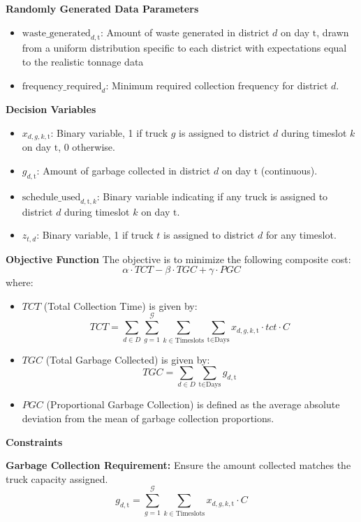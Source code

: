 \documentclass{article}
\begin{document}
\textbf{Randomly Generated Data Parameters}
\begin{itemize}
    \item \( \text{waste\_generated}_{d, \text{t}} \): Amount of waste generated in district \( d \) on day \( \text{t} \), drawn from a uniform distribution specific to each district with expectations equal to the realistic tonnage data
    \item \( \text{frequency\_required}_d \): Minimum required collection frequency for district \( d \).
\end{itemize}


\textbf{Decision Variables}
\begin{itemize}
    \item \( x_{d,g,k,\text{t}} \): Binary variable, 1 if truck \( g \) is assigned to district \( d \) during timeslot \( k \) on day \( \text{t} \), 0 otherwise.
    \item \( g_{d, \text{t}} \): Amount of garbage collected in district \( d \) on day \( \text{t} \) (continuous).
    \item \( \text{schedule\_used}_{d, \text{t}, k} \): Binary variable indicating if any truck is assigned to district \( d \) during timeslot \( k \) on day \( \text{t} \).
    \item \( z_{t,d} \): Binary variable, 1 if truck \( t \) is assigned to district \( d \) for any timeslot.
\end{itemize}


\textbf{Objective Function}
The objective is to minimize the following composite cost:
\[
\alpha \cdot TCT - \beta \cdot TGC + \gamma \cdot PGC
\]
where:

\begin{itemize}
    \item \( TCT \) (Total Collection Time) is given by:
    \[
    TCT = \sum_{d \in D} \sum_{g=1}^{\mathcal{G}} \sum_{k \in \text{Timeslots}} \sum_{\text{t} \in \text{Days}} x_{d,g,k,\text{t}} \cdot tct \cdot C
    \]
    \item \( TGC \) (Total Garbage Collected) is given by:
    \[
    TGC = \sum_{d \in D} \sum_{\text{t} \in \text{Days}} g_{d, \text{t}}
    \]
    \item \( PGC \) (Proportional Garbage Collection) is defined as the average absolute deviation from the mean of garbage collection proportions.
\end{itemize}


\textbf{Constraints}

\textbf{Garbage Collection Requirement:} Ensure the amount collected matches the truck capacity assigned.
\[
g_{d, \text{t}} = \sum_{g=1}^{\mathcal{G}} \sum_{k \in \text{Timeslots}} x_{d,g,k,\text{t}} \cdot C
\]
\end{document}
